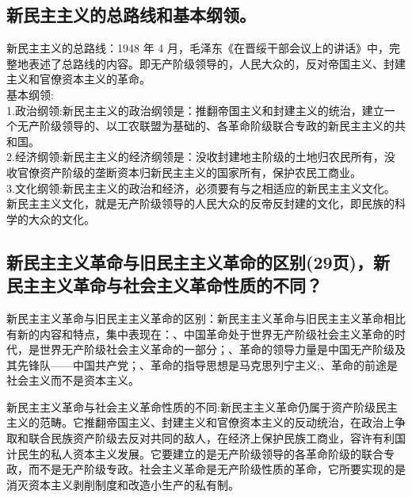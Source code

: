 \documentclass[cn,11pt]{elegantbook}
\begin{document}
\subsection{新民主主义的总路线和基本纲领。}
{\large 
{\heiti 新民主主义的总路线：}1948 年 4 月，毛泽东《在晋绥干部会议上的讲话》中，完整地表述了总路线的内容。即无产阶级领导的，人民大众的，反对帝国主义、封建主义和官僚资本主义的革命。\\
{\heiti 基本纲领:}\\
{\heiti 1.政治纲领:}新民主主义的政治纲领是：推翻帝国主义和封建主义的统治，建立一个无产阶级领导的、以工农联盟为基础的、各革命阶级联合专政的新民主主义的共和国。\\
{\heiti 2.经济纲领:}新民主主义的经济纲领是：没收封建地主阶级的土地归农民所有，没收官僚资产阶级的垄断资本归新民主主义的国家所有，保护农民工商业。\\
{\heiti 3.文化纲领:}新民主主义的政治和经济，必须要有与之相适应的新民主主义文化。新民主主义文化，就是无产阶级领导的人民大众的反帝反封建的文化，即民族的科学的大众的文化。

}
\subsection{新民主主义革命与旧民主主义革命的区别(29页)，新民主主义革命与社会主义革命性质的不同？}
{\large 
{\heiti 新民主主义革命与旧民主主义革命的区别：}新民主主义革命与旧民主主义革命相比有新的内容和特点，集中表现在：{、}中国革命处于世界无产阶级社会主义革命的时代，是世界无产阶级社会主义革命的一部分；{、}革命的领导力量是中国无产阶级及其先锋队——中国共产党；{、}革命的指导思想是马克思列宁主义;{、}革命的前途是社会主义而不是资本主义。

{\heiti 新民主主义革命与社会主义革命性质的不同:}新民主主义革命仍属于资产阶级民主主义的范畴。它推翻帝国主义、封建主义和官僚资本主义的反动统治，在政治上争取和联合民族资产阶级去反对共同的敌人，在经济上保护民族工商业，容许有利国计民生的私人资本主义发展。它要建立的是无产阶级领导的各革命阶级的联合专政，而不是无产阶级专政。社会主义革命是无产阶级性质的革命，它所要实现的是消灭资本主义剥削制度和改造小生产的私有制。
}
\end{document}
